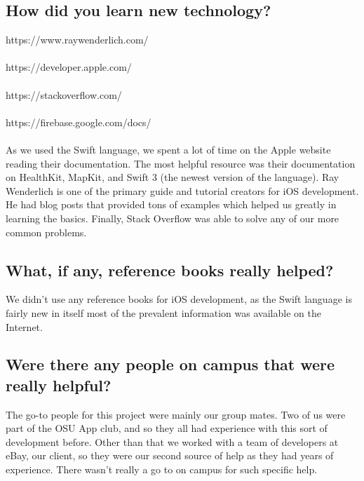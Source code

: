 \subsection{How did you learn new technology?}
https://www.raywenderlich.com/ \\\\
https://developer.apple.com/\\\\
https://stackoverflow.com/\\\\
https://firebase.google.com/docs/\\\\
As we used the Swift language, we spent a lot of time on the Apple website reading their documentation. The most helpful resource was their documentation on HealthKit, MapKit, and Swift 3 (the newest version of the language). Ray Wenderlich is one of the primary guide and tutorial creators for iOS development. He had blog posts that provided tons of examples which helped us greatly in learning the basics. Finally, Stack Overflow was able to solve any of our more common problems.

\subsection{What, if any, reference books really helped?}
We didn’t use any reference books for iOS development, as the Swift language is fairly new in itself most of the prevalent information was available on the Internet.

\subsection{Were there any people on campus that were really helpful?}
The go-to people for this project were mainly our group mates. Two of us were part of the OSU App club, and so they all had experience with this sort of development before. Other than that we worked with a team of developers at eBay, our client, so they were our second source of help as they had years of experience. There wasn't really a go to on campus for such specific help.
